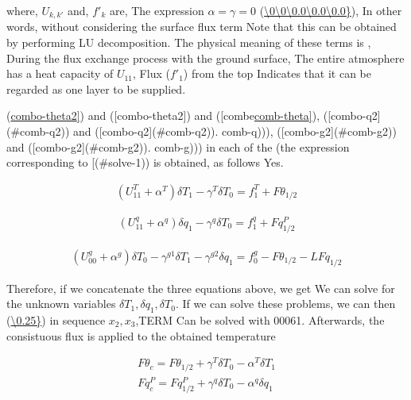 where, \(U_{k,k'}\) and, \(f'_k\) are, The expression
\(\alpha=\gamma=0\)
(\protect\hyperlink{solve-0}{\textbackslash0\textbackslash0\textbackslash0.0\textbackslash0.0\textbackslash0.0\}}),
In other words, without considering the surface flux term Note that this
can be obtained by performing LU decomposition. The physical meaning of
these terms is , During the flux exchange process with the ground
surface, The entire atmosphere has a heat capacity of \(U_{11}\), Flux
(\(f'_1\)) from the top Indicates that it can be regarded as one layer
to be supplied.

(\protect\hyperlink{comb-theta2}{combo-theta2{]}}) and
({[}combo-theta2{]}) and
({[}combe\protect\hyperlink{comb-theta}{comb-theta{]}}),
({[}combo-q2{]}(\#comb-q2)) and ({[}combo-q2{]}(\#comb-q2)). comb-q))),
({[}combo-g2{]}(\#comb-g2)) and ({[}combo-g2{]}(\#comb-g2)). comb-g)))
in each of the (the expression corresponding to
{[}\ltra[solve-1\end{eqnarray}](\#solve-1)) is obtained, as follows Yes.

\begin{eqnarray}
  ( U^{T}_{11} +  \alpha^{T}  ) \delta T_1 - \gamma^{T} \delta T_0
      = f^{T}_1 + F\theta_{1/2}
\end{eqnarray}

\begin{eqnarray}
  ( U^{q}_{11} +  \alpha^{q}  ) \delta q_1 - \gamma^{q} \delta T_0
      = f^{q}_1 + Fq^P_{1/2}
\end{eqnarray}

\begin{eqnarray}
  ( U^{g}_{00} +  \alpha^{g}  ) \delta T_0 - \gamma^{g1} \delta T_1
                                           - \gamma^{g2} \delta q_1
      = f^{g}_0 - F\theta_{1/2} - L Fq_{1/2}
\end{eqnarray}

Therefore, if we concatenate the three equations above, we get We can
solve for the unknown variables \(\delta T_1, \delta q_1, \delta T_0\).
If we can solve these problems, we can then
(\protect\hyperlink{solve-x}{\textbackslash0.25\}}) in sequence
\(x_2,x_3\),TERM Can be solved with 00061. Afterwards, the consistuous
flux is applied to the obtained temperature

\begin{eqnarray}
  F\theta_c  =  F\theta_{1/2}
                   + \gamma^{T} \delta T_0 -\alpha^{T} \delta T_1 \\
  Fq^P_c  =  Fq^P_{1/2}
                   + \gamma^{q} \delta T_0 -\alpha^{q} \delta q_1
\end{eqnarray}

